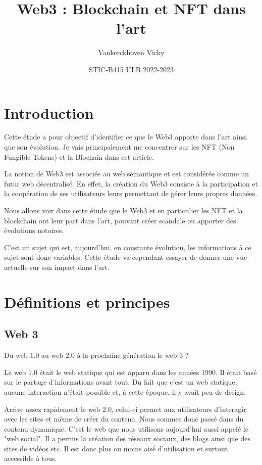 \documentclass[a4paper,11pt]{article}
\title{Web3 : Blockchain et NFT dans l'art}
\author{Vankerckhoven Vicky}
\date{STIC-B415 ULB 2022-2023}
\begin{document}
\maketitle


\tableofcontents
\break



\section{Introduction} %
Cette étude a pour objectif d'identifier ce que le Web3 apporte dans l'art ainsi que son évolution. Je vais principalement me concentrer sur les NFT (Non Fungible Tokens) et la Blochain dans cet article.

La notion de Web3 est associée au web sémantique et est considérée comme un futur web décentralisé. En effet, la création du Web3 consiste à la participation et la coopération de ses utilisateurs leurs permettant de gérer leurs propres données. 

Nous allons voir dans cette étude que le Web3 et en particulier les NFT et la blockchain ont leur part dans l'art, pouvant créer scandale ou apporter des évolutions notoires.

C'est un sujet qui est, aujourd'hui, en constante évolution, les informations à ce sujet sont donc variables. Cette étude va cependant essayer de donner une vue actuelle sur son impact dans l'art. 
\section{Définitions et principes} %
\subsection{Web 3} %
Du web 1.0 au web 2.0 à la prochaine génération le web 3 ?

Le web 1.0 était le web statique qui est apparu dans les années 1990. Il était basé sur le partage d'informations avant tout. Du fait que c'est un web statique, aucune interaction n'était possible et, à cette époque, il y avait peu de design. 

Arrive assez rapidement le web 2.0, celui-ci permet aux utilisateurs d'interagir avec les sites et même de créer du contenu. Nous sommes donc passé dans du contenu dynamique. C'est le web que nous utilisons aujourd'hui aussi appelé le "web social". Il a permis la création des réseaux sociaux, des blogs ainsi que des sites de vidéos etc. Il est donc plus ou moins aisé d'utilisation et surtout accessible à tous. 
\end{document}
